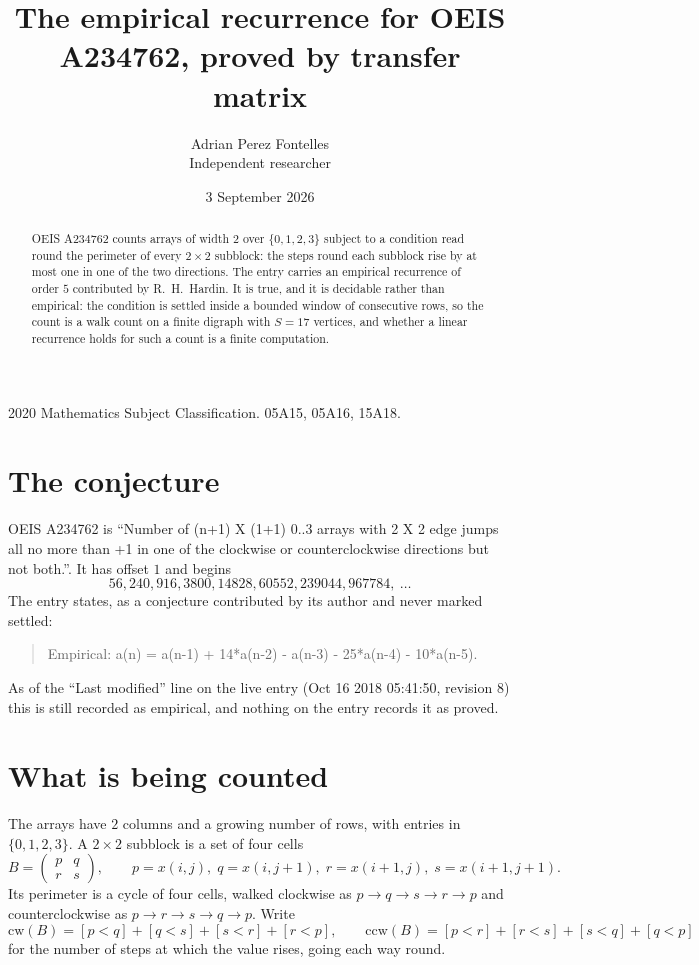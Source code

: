 \documentclass[11pt,a4paper]{article}
\title{The empirical recurrence for OEIS A234762, proved by transfer matrix}
\author{Adrian Perez Fontelles\\ \small Independent researcher}
\date{3 September 2026}
\theoremstyle{plain}
\theoremstyle{definition}
\begin{document}
\maketitle

\begin{abstract}
OEIS A234762 counts arrays of width $2$ over $\{0,1,2,3\}$ subject to a condition read round the
perimeter of every $2\times2$ subblock: the steps round each subblock rise by at most one in one of the two directions. The entry carries an empirical recurrence of
order $5$ contributed by R.~H.~Hardin. It is true, and it is decidable rather than
empirical: the condition is settled inside a bounded window of consecutive rows, so the
count is a walk count on a finite digraph with $S=17$ vertices, and whether a linear
recurrence holds for such a count is a finite computation.
\end{abstract}

\noindent\small 2020 Mathematics Subject Classification. 05A15, 05A16, 15A18.\normalsize

\section{The conjecture}

OEIS A234762 is ``Number of (n+1) X (1+1) 0..3 arrays with 2 X 2 edge jumps all no more than +1 in one of the clockwise or counterclockwise directions but not both.''. It has offset $1$ and begins
\[
56, 240, 916, 3800, 14828, 60552, 239044, 967784,\ \dots
\]
The entry states, as a conjecture contributed by its author and never marked settled:
\begin{quote}
Empirical: a(n) = a(n-1) + 14*a(n-2) - a(n-3) - 25*a(n-4) - 10*a(n-5).
\end{quote}
As of the ``Last modified'' line on the live entry (Oct 16 2018 05:41:50, revision 8) this is still
recorded as empirical, and nothing on the entry records it as proved.

\section{What is being counted}

The arrays have $2$ columns and a growing number of rows, with entries in $\{0,1,2,3\}$. A
$2\times2$ subblock is a set of four cells
\[
B=\begin{pmatrix} p & q \\ r & s \end{pmatrix},
\qquad p=x(i,j),\; q=x(i,j+1),\; r=x(i+1,j),\; s=x(i+1,j+1).
\]
Its perimeter is a cycle of four cells, walked clockwise as $p\to q\to s\to r\to p$ and
counterclockwise as $p\to r\to s\to q\to p$. Write
\[
\mathrm{cw}(B)=[p<q]+[q<s]+[s<r]+[r<p],\qquad
\mathrm{ccw}(B)=[p<r]+[r<s]+[s<q]+[q<p]
\]
for the number of steps at which the value rises, going each way round.
\end{document}
